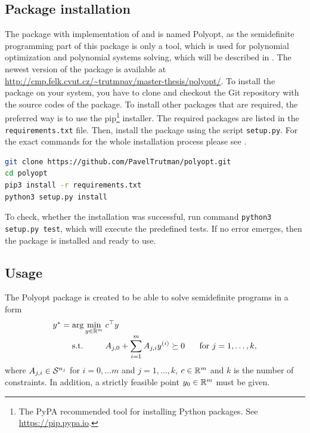 \subsection{Package installation}
The package with implementation of  and  is named Polyopt, as the semidefinite programming part of this package is only a tool, which is  used for polynomial optimization and polynomial systems solving, which will be described in .
The newest version of the package is available at \url{http://cmp.felk.cvut.cz/~trutmpav/master-thesis/polyopt/}.
To install the package on your system, you have to clone and checkout the Git repository with the source codes of the package.
To install other packages that are required, the preferred way is to use the pip\footnote{The PyPA recommended tool for installing Python packages. See \url{https://pip.pypa.io}.} installer. The required packages are listed in the \texttt{requirements.txt} file.
Then, install the package using the script \texttt{setup.py}.
For the exact commands for the whole installation process please see .
\begin{lstlisting}[language=bash, caption={Installation of the package Polyopt.}, labellis={SDP:imp:install}]
git clone https://github.com/PavelTrutman/polyopt.git
cd polyopt
pip3 install -r requirements.txt
python3 setup.py install
\end{lstlisting}
To check, whether the installation was successful, run command \texttt{python3 setup.py test}, which will execute the predefined tests.
If no error emerges, then the package is installed and ready to use.

\subsection{Usage}
The Polyopt package is created to be able to solve semidefinite programs in a form
\begin{align}
  \arraycolsep=1.4pt
  \begin{array}{rclrcl@{\hskip0.5cm}l}
    y^* &=& \displaystyle \arg\min_{y\in\R^m} & \multicolumn{3}{l}{c^\top y} \\
    && \text{s.t.} & \displaystyle A_{j,0} + \sum_{i=1}^m A_{j,i}y\ind i &\succeq& 0 & \text{ for } j = 1,\ldots,k,
  \end{array}\labeleq{SDP:imp:problem}
\end{align}
where $A_{j,i}\in\mathcal{S}^{n_j}$ for $i = 0,\dots m$ and $j=1,\dots,k$, $c\in\mathbb{R}^m$ and $k$ is the number of constraints.
In addition, a strictly feasible point $y_0\in\mathbb{R}^m$ must be given.

